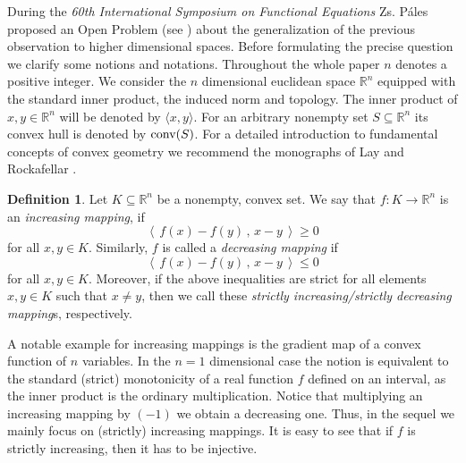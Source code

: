 \documentclass[12pt]{amsart}
\theoremstyle{remark}
\theoremstyle{definition}
\newtheorem{defin}{Definition}%
\newcommand{\Rn}{\mathbb{R}^n}
\newcommand{\conv}{\mbox{\rm conv}}
\newcommand{\map}{\longrightarrow}
\begin{document}
During the 
{\em 60th International Symposium on Functional Equations} 
Zs. Páles proposed an Open Problem (see \cite[4. Problem]{60ISFE}) 
about the generalization of the previous observation to 
higher dimensional spaces. 
Before formulating the precise question we clarify some 
notions and notations. Throughout the whole paper 
$ n $ denotes a positive integer. We consider the $ n $ 
dimensional euclidean space $ \Rn $ equipped with 
the standard inner product, 
the induced norm and topology.  The inner product of 
$ x,y \in \Rn $ will be denoted by $ \langle x, y \rangle $. 
For an arbitrary nonempty set $ S \subseteq \Rn $ its convex 
hull is denoted by $ \conv(S) $. 
For a detailed introduction to fundamental concepts of 
convex geometry we recommend the monographs 
of Lay \cite{Lay82} and Rockafellar \cite{Roc70}. 

\begin{defin}\label{def-StrictlyMon}
Let $ K \subseteq \Rn $ be a nonempty, convex set. 
We say that $ f : K \map \Rn $ 
is an {\em increasing mapping}, if 
\[
\left \langle \, f(x) - f(y) \, , \, 
x - y \, \right \rangle \geq 0 
\] 
for all $ x,y \in K $. Similarly, $ f $ is called a 
{\em decreasing mapping} if 
\[
\left \langle \, f(x) - f(y) \, , \, 
x - y \, \right \rangle \leq 0 
\] 
for all $ x,y \in K $. 
Moreover, if the above inequalities are strict 
for all elements $ x,y \in K $ 
such that $ x \neq y $, then we call these 
{\em strictly increasing/strictly decreasing mapping}s, 
respectively.  
\end{defin}

A notable example for increasing mappings is the gradient 
map of a convex function of $ n $ variables. 
In the $ n=1 $ dimensional case the notion is 
equivalent to the standard (strict) monotonicity 
of a real function $ f $ defined on an interval, 
as the inner product 
is the ordinary multiplication. 
Notice that multiplying an increasing mapping by $ (-1) $ 
we obtain a decreasing one. Thus, in the sequel we mainly 
focus on (strictly) increasing mappings. 
It is easy to see that 
if $ f $ is strictly increasing, then it has to be injective. 
\end{document}
